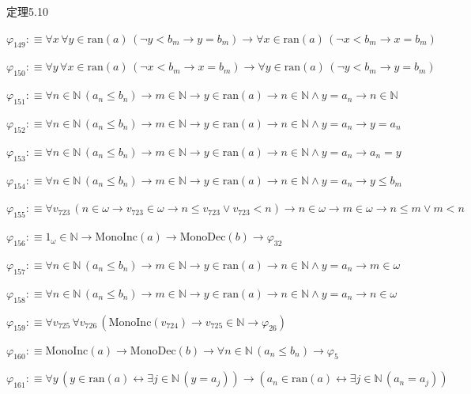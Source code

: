 \begin{fullproof}{定理5.10}
\begin{abbrevlist}
\item $\varphi_{149} :\equiv \forall x\,\forall y \in \mathrm{ran}(a)\,(\neg y < b_{m} \to y = b_{m}) \to \forall x \in \mathrm{ran}(a)\,(\neg x < b_{m} \to x = b_{m})$
\item $\varphi_{150} :\equiv \forall y\,\forall x \in \mathrm{ran}(a)\,(\neg x < b_{m} \to x = b_{m}) \to \forall y \in \mathrm{ran}(a)\,(\neg y < b_{m} \to y = b_{m})$
\item $\varphi_{151} :\equiv \forall n \in \mathbb{N}\,(a_{n} \leq b_{n}) \to m \in \mathbb{N} \to y \in \mathrm{ran}(a) \to n \in \mathbb{N} \land y = a_{n} \to n \in \mathbb{N}$
\item $\varphi_{152} :\equiv \forall n \in \mathbb{N}\,(a_{n} \leq b_{n}) \to m \in \mathbb{N} \to y \in \mathrm{ran}(a) \to n \in \mathbb{N} \land y = a_{n} \to y = a_{n}$
\item $\varphi_{153} :\equiv \forall n \in \mathbb{N}\,(a_{n} \leq b_{n}) \to m \in \mathbb{N} \to y \in \mathrm{ran}(a) \to n \in \mathbb{N} \land y = a_{n} \to a_{n} = y$
\item $\varphi_{154} :\equiv \forall n \in \mathbb{N}\,(a_{n} \leq b_{n}) \to m \in \mathbb{N} \to y \in \mathrm{ran}(a) \to n \in \mathbb{N} \land y = a_{n} \to y \leq b_{m}$
\item $\varphi_{155} :\equiv \forall v_{723}\,(n \in \omega \to v_{723} \in \omega \to n \leq v_{723} \lor v_{723} < n) \to n \in \omega \to m \in \omega \to n \leq m \lor m < n$
\item $\varphi_{156} :\equiv 1_{\omega} \in \mathbb{N} \to \mathrm{MonoInc}(a) \to \mathrm{MonoDec}(b) \to \varphi_{32}$
\item $\varphi_{157} :\equiv \forall n \in \mathbb{N}\,(a_{n} \leq b_{n}) \to m \in \mathbb{N} \to y \in \mathrm{ran}(a) \to n \in \mathbb{N} \land y = a_{n} \to m \in \omega$
\item $\varphi_{158} :\equiv \forall n \in \mathbb{N}\,(a_{n} \leq b_{n}) \to m \in \mathbb{N} \to y \in \mathrm{ran}(a) \to n \in \mathbb{N} \land y = a_{n} \to n \in \omega$
\item $\varphi_{159} :\equiv \forall v_{725}\,\forall v_{726}\,(\mathrm{MonoInc}(v_{724}) \to v_{725} \in \mathbb{N} \to \varphi_{26})$
\item $\varphi_{160} :\equiv \mathrm{MonoInc}(a) \to \mathrm{MonoDec}(b) \to \forall n \in \mathbb{N}\,(a_{n} \leq b_{n}) \to \varphi_{5}$
\item $\varphi_{161} :\equiv \forall y\,(y \in \mathrm{ran}(a) \leftrightarrow \exists j \in \mathbb{N}\,(y = a_{j})) \to (a_{n} \in \mathrm{ran}(a) \leftrightarrow \exists j \in \mathbb{N}\,(a_{n} = a_{j}))$

\end{abbrevlist}
\end{fullproof}
